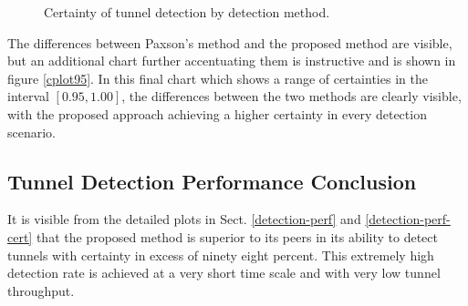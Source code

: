 \documentclass{llncs}
\begin{document}

\begin{figure}
\centering
{}
\caption{Certainty of tunnel detection by detection method.}
\end{figure}

The differences between Paxson's method and the proposed method are visible, but
an additional chart further accentuating them is instructive and is shown in
figure \ref{cplot95}. In this final chart which shows a range of certainties in
the interval $[0.95,1.00]$, the differences between the two methods are clearly
visible, with the proposed approach achieving a higher certainty in every
detection scenario.

\subsection{Tunnel Detection Performance Conclusion}
It is visible from the detailed plots in Sect. \ref{detection-perf} and
\ref{detection-perf-cert} that the proposed method is superior to its peers in
its ability to detect tunnels with certainty in excess of ninety eight percent.
This extremely high detection rate is achieved at a very short time scale and
with very low tunnel throughput.
\end{document}
